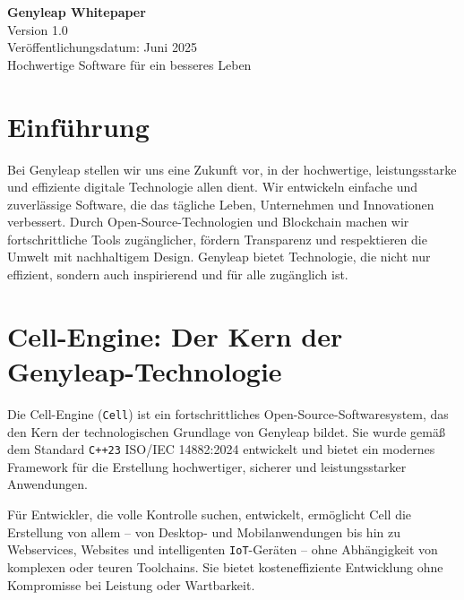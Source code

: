 \documentclass[a4paper,12pt,openany]{book}
\begin{document}
\begin{titlepage}
    \begin{center}
        \vspace*{1.5cm}
        {\Huge \textbf{Genyleap Whitepaper}} \\
        \vspace{0.5cm}
        {\Large Version 1.0} \\
        \vspace{0.5cm}
        {\large Veröffentlichungsdatum: Juni 2025} \\
        \vspace{1.5cm}
        {\large Hochwertige Software für ein besseres Leben} \\
    \end{center}
    \vfill
\end{titlepage}

\chapter{Einführung}
Bei Genyleap stellen wir uns eine Zukunft vor, in der hochwertige, leistungsstarke und effiziente digitale Technologie allen dient. Wir entwickeln einfache und zuverlässige Software, die das tägliche Leben, Unternehmen und Innovationen verbessert. Durch Open-Source-Technologien und Blockchain machen wir fortschrittliche Tools zugänglicher, fördern Transparenz und respektieren die Umwelt mit nachhaltigem Design. Genyleap bietet Technologie, die nicht nur effizient, sondern auch inspirierend und für alle zugänglich ist.

\chapter{Cell-Engine: Der Kern der Genyleap-Technologie}

Die Cell-Engine (\texttt{Cell}) ist ein fortschrittliches Open-Source-Softwaresystem, das den Kern der technologischen Grundlage von Genyleap bildet. Sie wurde gemäß dem Standard \texttt{C++23} ISO/IEC 14882:2024 entwickelt und bietet ein modernes Framework für die Erstellung hochwertiger, sicherer und leistungsstarker Anwendungen.

Für Entwickler, die volle Kontrolle suchen, entwickelt, ermöglicht Cell die Erstellung von allem – von Desktop- und Mobilanwendungen bis hin zu Webservices, Websites und intelligenten \texttt{IoT}-Geräten – ohne Abhängigkeit von komplexen oder teuren Toolchains. Sie bietet kosteneffiziente Entwicklung ohne Kompromisse bei Leistung oder Wartbarkeit.
\end{document}
